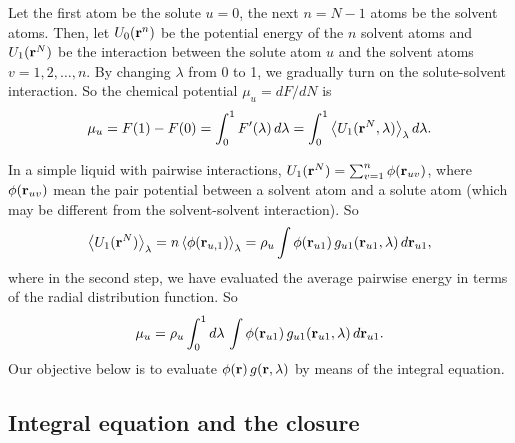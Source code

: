 \documentclass{article}
\begin{document}
Let the first atom be the solute $u = 0$,
  the next $n = N - 1$ atoms be the solvent atoms.
Then,
  let $U_0(\mathbf{r}^n)$ be the potential energy of the $n$ solvent atoms
  and $U_1(\mathbf{r}^N)$ be the interaction between the solute atom $u$
  and the solvent atoms $v = 1, 2, \dots, n$.
By changing $\lambda$ from 0 to 1, we gradually turn on
  the solute-solvent interaction.
%
So the chemical potential $\mu_u = dF/dN$ is
\begin{align}
  \mu_u
  =
  F(1) - F(0)
  =
  \int_0^1 F'(\lambda) \, d\lambda
  =
  \int_0^1
    \left\langle
      U_1(\mathbf{r}^N, \lambda)
    \right\rangle_\lambda d\lambda.
\end{align}




In a simple liquid with pairwise interactions,
  $U_1(\mathbf{r}^N) = \sum_{v = 1}^{n} \phi(\mathbf{r}_{uv})$,
  where $\phi(\mathbf{r}_{uv})$ mean the pair potential
  between a solvent atom and a solute atom
  (which may be different from the solvent-solvent
  interaction).
So
\begin{equation}
    \left\langle
      U_1(\mathbf{r}^N)
    \right\rangle_\lambda
    =
    n
    \left\langle
      \phi(\mathbf{r}_{u,1})
    \right\rangle_\lambda
    =
    \rho_u \int \phi(\mathbf{r}_{u1}) \, g_{u1}(\mathbf{r}_{u1}, \lambda) \, d\mathbf{r}_{u1},
  \label{eq:uphig}
\end{equation}
%
where in the second step, we have evaluated the average
pairwise energy in terms of the radial distribution function.
So
\begin{equation}
    \mu_u
    =
    \rho_u \int_0^1 d\lambda \,
      \int \phi(\mathbf{r}_{u1}) \, g_{u1}(\mathbf{r}_{u1}, \lambda) \, d\mathbf{r}_{u1}.
  \label{eq:muti}
\end{equation}
Our objective below is to evaluate
$\phi(\mathbf{r}) \, g(\mathbf{r}, \lambda)$
by means of the integral equation.




\subsection{Integral equation and the closure}
\end{document}
